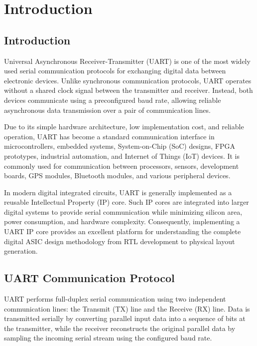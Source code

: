 \chapter{Introduction}

\section{Introduction}

Universal Asynchronous Receiver-Transmitter (UART) is one of the most widely used serial communication protocols for exchanging digital data between electronic devices. Unlike synchronous communication protocols, UART operates without a shared clock signal between the transmitter and receiver. Instead, both devices communicate using a preconfigured baud rate, allowing reliable asynchronous data transmission over a pair of communication lines.

Due to its simple hardware architecture, low implementation cost, and reliable operation, UART has become a standard communication interface in microcontrollers, embedded systems, System-on-Chip (SoC) designs, FPGA prototypes, industrial automation, and Internet of Things (IoT) devices. It is commonly used for communication between processors, sensors, development boards, GPS modules, Bluetooth modules, and various peripheral devices.

In modern digital integrated circuits, UART is generally implemented as a reusable Intellectual Property (IP) core. Such IP cores are integrated into larger digital systems to provide serial communication while minimizing silicon area, power consumption, and hardware complexity. Consequently, implementing a UART IP core provides an excellent platform for understanding the complete digital ASIC design methodology from RTL development to physical layout generation.


\section{UART Communication Protocol}

UART performs full-duplex serial communication using two independent communication lines: the Transmit (TX) line and the Receive (RX) line. Data is transmitted serially by converting parallel input data into a sequence of bits at the transmitter, while the receiver reconstructs the original parallel data by sampling the incoming serial stream using the configured baud rate.

